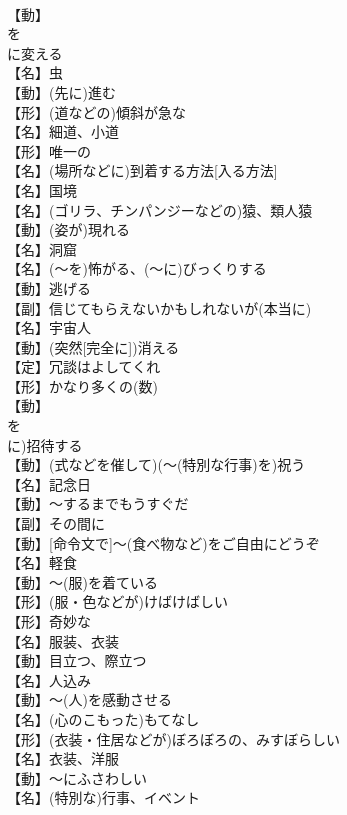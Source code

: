 \documentclass[8pt]{extreport}
\begin{document}
\begin{CJK}{UTF8}{min}
\\	【動】
\\	を
\\	に変える
\\	【名】虫
\\	【動】(先に)進む
\\	【形】(道などの)傾斜が急な
\\	【名】細道、小道
\\	【形】唯一の
\\	【名】(場所などに)到着する方法[入る方法]
\\	【名】国境
\\	【名】(ゴリラ、チンパンジーなどの)猿、類人猿
\\	【動】(姿が)現れる
\\	【名】洞窟
\\	【名】(～を)怖がる、(～に)びっくりする
\\	【動】逃げる
\\	【副】信じてもらえないかもしれないが(本当に)
\\	【名】宇宙人
\\	【動】(突然[完全に])消える
\\	【定】冗談はよしてくれ
\\	【形】かなり多くの(数)
\\	【動】
\\	を
\\	に)招待する
\\	【動】(式などを催して)(～(特別な行事)を)祝う
\\	【名】記念日
\\	【動】～するまでもうすぐだ
\\	【副】その間に
\\	【動】[命令文で]～(食べ物など)をご自由にどうぞ
\\	【名】軽食
\\	【動】～(服)を着ている
\\	【形】(服・色などが)けばけばしい
\\	【形】奇妙な
\\	【名】服装、衣装
\\	【動】目立つ、際立つ
\\	【名】人込み
\\	【動】～(人)を感動させる
\\	【名】(心のこもった)もてなし
\\	【形】(衣装・住居などが)ぼろぼろの、みすぼらしい
\\	【名】衣装、洋服
\\	【動】～にふさわしい
\\	【名】(特別な)行事、イベント

\end{CJK}
\end{document}
